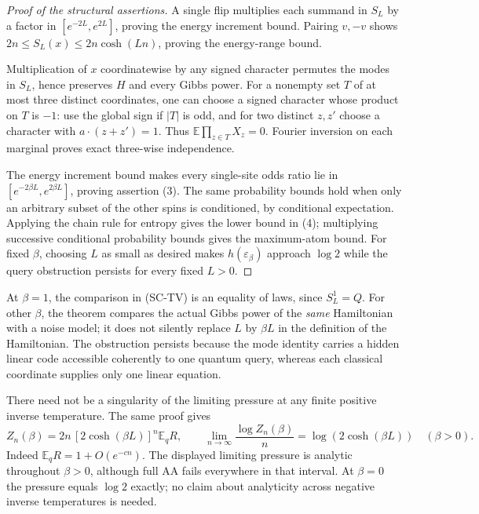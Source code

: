 \begin{proof}[Proof of the structural assertions]
A single flip multiplies each summand in $S_L$ by a factor in
$[e^{-2L},e^{2L}]$, proving the energy increment bound.  Pairing $v,-v$
shows
$2n\le S_L(x)\le2n\cosh(Ln)$, proving the energy-range bound.

Multiplication of $x$ coordinatewise by any signed character permutes
the modes in $S_L$, hence preserves $H$ and every Gibbs power.  For a
nonempty set $T$ of at most three distinct coordinates, one can choose
a signed character whose product on $T$ is $-1$: use the global sign
if $|T|$ is odd, and for two distinct $z,z'$ choose a character with
$a\cdot(z+z')=1$.  Thus
$\mathbb E\prod_{z\in T}X_z=0$.  Fourier inversion on each marginal
proves exact three-wise independence.

The energy increment bound makes every single-site odds ratio lie in
$[e^{-2\beta L},e^{2\beta L}]$, proving assertion (3).  The same
probability bounds hold when only an arbitrary subset of the other
spins is conditioned, by conditional expectation.  Applying the
chain rule for entropy gives the lower bound in (4); multiplying
successive conditional probability bounds gives the maximum-atom
bound.  For fixed $\beta$, choosing $L$ as small as desired makes
$h(\varepsilon_\beta)$ approach $\log2$ while the query obstruction
persists for every fixed $L>0$.
\end{proof}

At $\beta=1$, the comparison in (SC-TV) is an equality of laws, since
$S_L^1=Q$.  For other $\beta$, the theorem compares the actual Gibbs
power of the \emph{same} Hamiltonian with a noise model; it does not
silently replace $L$ by $\beta L$ in the definition of the Hamiltonian.
The obstruction persists because the mode identity carries a hidden
linear code accessible coherently to one quantum query, whereas each
classical coordinate supplies only one linear equation.

There need not be a singularity of the limiting pressure at any finite
positive inverse temperature. The same proof gives
\[
 Z_n(\beta)=2n\,[2\cosh(\beta L)]^n\mathbb E_qR,
 \qquad
 \lim_{n\to\infty}\frac{\log Z_n(\beta)}n
       =\log(2\cosh(\beta L))\quad(\beta>0).
\]
Indeed $\mathbb E_qR=1+O(e^{-cn})$. The displayed limiting pressure is
analytic throughout $\beta>0$, although full AA fails everywhere in
that interval. At $\beta=0$ the pressure equals $\log2$ exactly; no
claim about analyticity across negative inverse temperatures is needed.
